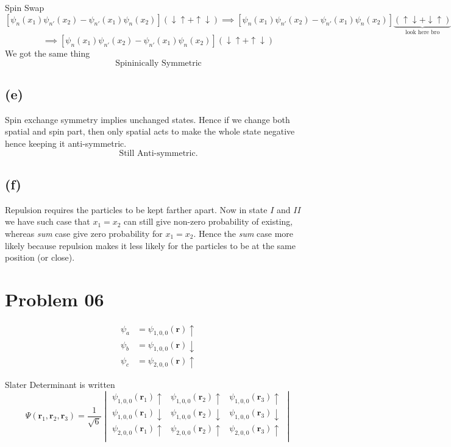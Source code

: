 \documentclass[a4paper]{article}
\begin{document}
Spin Swap
			\[ 
				\left[ 
			\psi_n(x_1)   \psi_{n'} (x_2) - 
			\psi_{n'}(x_1) \psi_n (x_2) \right] (\downarrow \uparrow  
		+ \uparrow \downarrow  ) 
				\implies 
				\left[ 
			\psi_n(x_1)   \psi_{n'} (x_2) - 
			\psi_{n'}(x_1) \psi_n (x_2) \right]
			\underbrace{(  
			\uparrow \downarrow + \downarrow \uparrow) }_{\text{look here bro}}
	\]
			\[ 
			\implies 	\left[ 
			\psi_n(x_1)   \psi_{n'} (x_2) - 
			\psi_{n'}(x_1) \psi_n (x_2) \right] (\downarrow \uparrow  
		+ \uparrow \downarrow  )  \]
We got the same thing 
\[
\boxed{
\text{Spininically Symmetric}
}
\] 


\subsection*{(e)} 
Spin exchange symmetry implies unchanged states. Hence if we change both spatial and spin part, then only spatial acts to make the whole state negative hence keeping it anti-symmetric.
\[
\boxed{
\text{Still Anti-symmetric.}
}
\] 

\subsection*{(f)}
Repulsion requires the particles to be kept farther apart. Now in state $I$ and $I I $ we have such case that $x_1 = x_2$ can still give non-zero probability of existing, whereas \textit{sum} case give zero probability for $x_1 = x_2$. Hence the \textit{sum} case more likely because repulsion makes it less likely for the particles to be at the same position (or close).  




\section*{Problem 06}
\begin{align*}
\psi_a &= \psi_{1,0,0}(\mathbf{r})\uparrow \\
\psi_b &= \psi_{1,0,0}(\mathbf{r})\downarrow \\
\psi_c &= \psi_{2,0,0}(\mathbf{r})\uparrow
\end{align*}

Slater Determinant is written 
\[
\Psi(\mathbf{r}_1, \mathbf{r}_2, \mathbf{r}_3) = \frac{1}{\sqrt{6}}
\begin{vmatrix}
\psi_{1,0,0}(\mathbf{r}_1)\uparrow & \psi_{1,0,0}(\mathbf{r}_2)\uparrow & \psi_{1,0,0}(\mathbf{r}_3)\uparrow \\
\psi_{1,0,0}(\mathbf{r}_1)\downarrow & \psi_{1,0,0}(\mathbf{r}_2)\downarrow & \psi_{1,0,0}(\mathbf{r}_3)\downarrow \\
\psi_{2,0,0}(\mathbf{r}_1)\uparrow & \psi_{2,0,0}(\mathbf{r}_2)\uparrow & \psi_{2,0,0}(\mathbf{r}_3)\uparrow \\
\end{vmatrix}
\]
\end{document}
